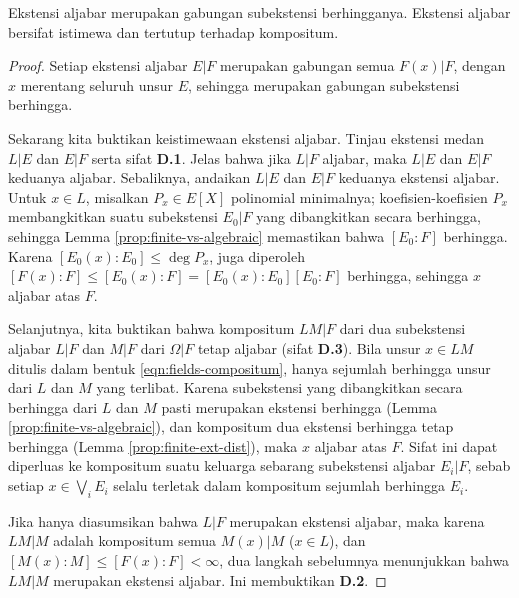 \begin{proposition}\label{prop:alg-ext-dist}
	Ekstensi aljabar merupakan gabungan subekstensi berhingganya. Ekstensi aljabar bersifat istimewa dan tertutup terhadap kompositum.
\end{proposition}
\begin{proof}
	Setiap ekstensi aljabar $E|F$ merupakan gabungan semua $F(x)|F$, dengan $x$ merentang seluruh unsur $E$, sehingga merupakan gabungan subekstensi berhingga.

	Sekarang kita buktikan keistimewaan ekstensi aljabar. Tinjau ekstensi medan $L|E$ dan $E|F$ serta sifat \textbf{D.1}. Jelas bahwa jika $L|F$ aljabar, maka $L|E$ dan $E|F$ keduanya aljabar. Sebaliknya, andaikan $L|E$ dan $E|F$ keduanya ekstensi aljabar. Untuk $x \in L$, misalkan $P_x \in E[X]$ polinomial minimalnya; koefisien-koefisien $P_x$ membangkitkan suatu subekstensi $E_0|F$ yang dibangkitkan secara berhingga, sehingga Lemma \ref{prop:finite-vs-algebraic} memastikan bahwa $[E_0:F]$ berhingga. Karena $[E_0(x) : E_0] \leq \deg P_x$, juga diperoleh $[F(x):F] \leq [E_0(x):F] = [E_0(x):E_0] [E_0:F]$ berhingga, sehingga $x$ aljabar atas $F$.

	Selanjutnya, kita buktikan bahwa kompositum $LM|F$ dari dua subekstensi aljabar $L|F$ dan $M|F$ dari $\Omega|F$ tetap aljabar (sifat \textbf{D.3}). Bila unsur $x \in LM$ ditulis dalam bentuk \eqref{eqn:fields-compositum}, hanya sejumlah berhingga unsur dari $L$ dan $M$ yang terlibat. Karena subekstensi yang dibangkitkan secara berhingga dari $L$ dan $M$ pasti merupakan ekstensi berhingga (Lemma \ref{prop:finite-vs-algebraic}), dan kompositum dua ekstensi berhingga tetap berhingga (Lemma \ref{prop:finite-ext-dist}), maka $x$ aljabar atas $F$. Sifat ini dapat diperluas ke kompositum suatu keluarga sebarang subekstensi aljabar $E_i|F$, sebab setiap $x \in \bigvee_i E_i$ selalu terletak dalam kompositum sejumlah berhingga $E_i$.

	Jika hanya diasumsikan bahwa $L|F$ merupakan ekstensi aljabar, maka karena $LM|M$ adalah kompositum semua $M(x)|M$ ($x \in L$), dan $[M(x):M] \leq [F(x):F] < \infty$, dua langkah sebelumnya menunjukkan bahwa $LM|M$ merupakan ekstensi aljabar. Ini membuktikan \textbf{D.2}.
\end{proof}

